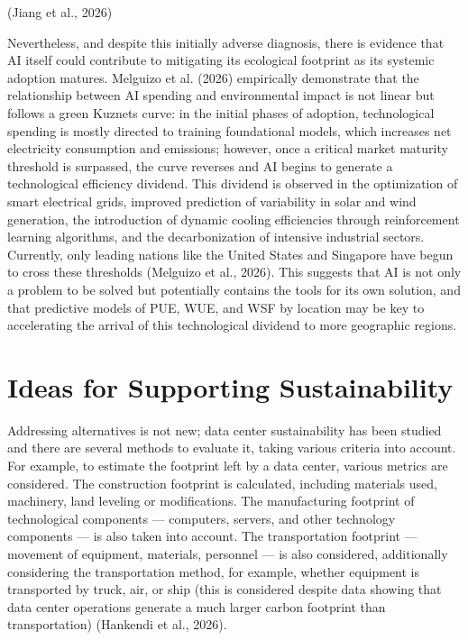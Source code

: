 \documentclass[conference]{IEEEtran}
\begin{document}
(Jiang et al., 2026)

Nevertheless, and despite this initially adverse diagnosis, there is evidence that AI itself could contribute to mitigating its ecological footprint as its systemic adoption matures. Melguizo et al. (2026) empirically demonstrate that the relationship between AI spending and environmental impact is not linear but follows a green Kuznets curve: in the initial phases of adoption, technological spending is mostly directed to training foundational models, which increases net electricity consumption and emissions; however, once a critical market maturity threshold is surpassed, the curve reverses and AI begins to generate a technological efficiency dividend. This dividend is observed in the optimization of smart electrical grids, improved prediction of variability in solar and wind generation, the introduction of dynamic cooling efficiencies through reinforcement learning algorithms, and the decarbonization of intensive industrial sectors. Currently, only leading nations like the United States and Singapore have begun to cross these thresholds (Melguizo et al., 2026). This suggests that AI is not only a problem to be solved but potentially contains the tools for its own solution, and that predictive models of PUE, WUE, and WSF by location may be key to accelerating the arrival of this technological dividend to more geographic regions.

\section{Ideas for Supporting Sustainability}

Addressing alternatives is not new; data center sustainability has been studied and there are several methods to evaluate it, taking various criteria into account. For example, to estimate the footprint left by a data center, various metrics are considered. The construction footprint is calculated, including materials used, machinery, land leveling or modifications. The manufacturing footprint of technological components — computers, servers, and other technology components — is also taken into account. The transportation footprint — movement of equipment, materials, personnel — is also considered, additionally considering the transportation method, for example, whether equipment is transported by truck, air, or ship (this is considered despite data showing that data center operations generate a much larger carbon footprint than transportation) (Hankendi et al., 2026).
\end{document}
